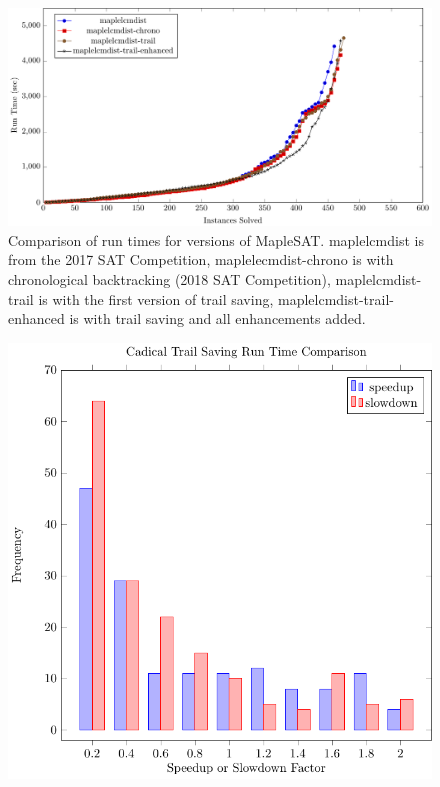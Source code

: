 \documentclass{article}
\begin{document}
\begin{figure}\includegraphics[scale=0.8]{cactus_maple2.pdf}\caption{\small{Comparison of run times for versions of MapleSAT. maplelcmdist is from the 2017 SAT Competition, maplelecmdist-chrono is with chronological backtracking (2018 SAT Competition), maplelcmdist-trail is with the first version of trail saving, maplelcmdist-trail-enhanced is with trail saving and all enhancements added.}}\end{figure}
\begin{figure}\includegraphics[scale=0.8]{test.pdf}\caption{}\end{figure}
\end{document}
